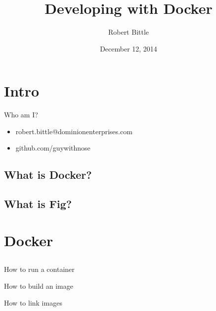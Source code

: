 \documentclass{beamer}
\title[Developing with Docker]{Developing with Docker}
\author{Robert Bittle}
\date{December 12, 2014}
\begin{document}
    \begin{frame}
    \titlepage
    \end{frame}


    \section{Intro}
    \begin{frame}{Who am I?}
        \begin{itemize}
            \item robert.bittle@dominionenterprises.com
            \item github.com/guywithnose
        \end{itemize}
    \end{frame}
    \subsection{What is Docker?}
    \begin{frame}{}
    \end{frame}
    \subsection{What is Fig?}
    \begin{frame}{}
    \end{frame}
    \section{Docker}
    \subsection{}
    \begin{frame}{How to run a container}
    \end{frame}
    \begin{frame}{How to build an image}
    \end{frame}
    \begin{frame}{How to link images}
    \end{frame}
\end{document}
